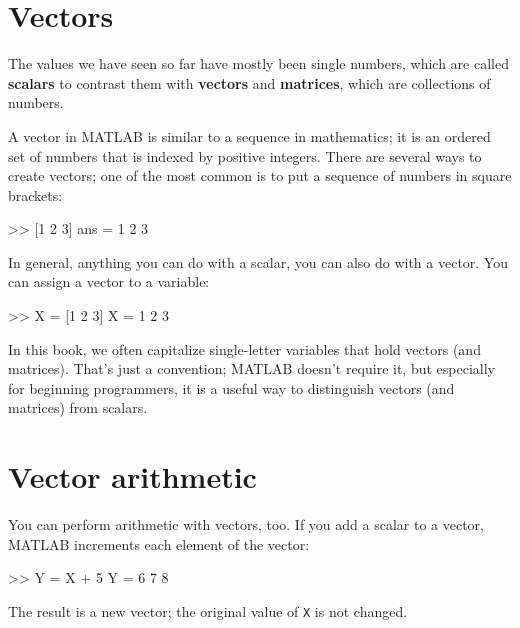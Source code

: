 \documentclass[
]{book}
\numberwithin{Answer}{chapter}
\numberwithin{Exercise}{chapter}
\begin{document}



\section{Vectors}

The values we have seen so far have mostly been single numbers,
which are called {\bf scalars} to contrast them with {\bf vectors}
and {\bf matrices}, which are collections of numbers.


A vector in MATLAB is similar to a sequence in mathematics;
it is an ordered set of numbers that is indexed by positive integers.
There are several ways to create vectors; one of the most common is
to put a sequence of numbers in square brackets:

\begin{code}
>> [1 2 3]
ans = 1     2     3
\end{code}

In general, anything you can do with a scalar, you can also do with
a vector.  You can assign a vector to a variable:

\begin{code}
>> X = [1 2 3]
X = 1     2     3
\end{code}

In this book, we often capitalize single-letter variables that hold vectors 
(and matrices).
That's just a convention; MATLAB doesn't require it, but especially for beginning programmers, it is a useful way to distinguish vectors (and matrices) from scalars.



\section{Vector arithmetic}


You can perform arithmetic with vectors, too.  If you add a scalar
to a vector, MATLAB increments each element of the vector:

\begin{code}
>> Y = X + 5
Y = 6     7     8
\end{code}

The result is a new vector; the original value of {\tt X} is not
changed.
\end{document}
